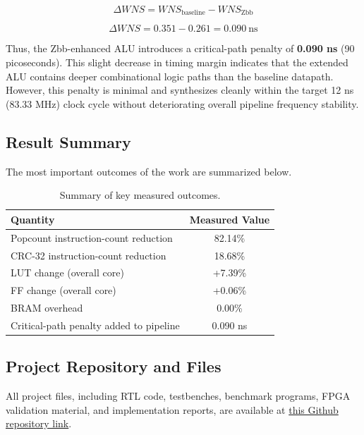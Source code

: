 \documentclass[conference]{IEEEtran}
\begin{document}
	\begin{equation}
		\Delta WNS = WNS_{\text{baseline}} - WNS_{\text{Zbb}}
	\end{equation}
	
	\begin{equation}
		\Delta WNS = 0.351 - 0.261 = 0.090~\text{ns}
	\end{equation}
	
	Thus, the Zbb-enhanced ALU introduces a critical-path penalty of \textbf{0.090 ns} (90 picoseconds). This slight decrease in timing margin indicates that the extended ALU contains deeper combinational logic paths than the baseline datapath. However, this penalty is minimal and synthesizes cleanly within the target 12 ns (83.33 MHz) clock cycle without deteriorating overall pipeline frequency stability.
	
	\subsection{Result Summary}
	The most important outcomes of the work are summarized below.
	
	\begin{table}[H]
		\centering
		\caption{Summary of key measured outcomes.}
		\label{tab:summary}
		\begin{tabular}{lc}
			\toprule
			\textbf{Quantity} & \textbf{Measured Value} \\
			\midrule
			Popcount instruction-count reduction & 82.14\% \\
			CRC-32 instruction-count reduction & 18.68\% \\
			LUT change (overall core) & +7.39\% \\
			FF change (overall core) & +0.06\% \\
			BRAM overhead & 0.00\% \\
			Critical-path penalty added to pipeline & 0.090 ns \\
			\bottomrule
		\end{tabular}
	\end{table}
	
	\subsection{Project Repository and Files}
	All project files, including RTL code, testbenches, benchmark programs, FPGA validation material, and implementation reports, are available at \href{https://github.com/hustlewithkunal/COA-Zbb-Extension}{this Github repository link}.
	
\end{document}

